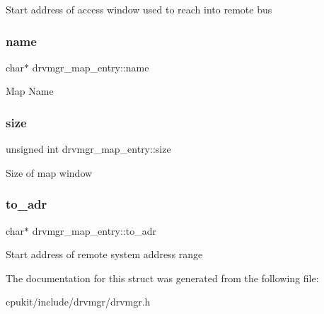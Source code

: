 Start address of access window used to reach into remote bus \mbox{\label{structdrvmgr__map__entry_ab2f1dd43f429f44321b1671b23138f14}} 
\subsubsection{\texorpdfstring{name}{name}}
{\footnotesize\ttfamily char$\ast$ drvmgr\+\_\+map\+\_\+entry\+::name}

Map Name \mbox{\label{structdrvmgr__map__entry_a6e86bd0c574cd6f7ef1046a4864caccd}} 
\subsubsection{\texorpdfstring{size}{size}}
{\footnotesize\ttfamily unsigned int drvmgr\+\_\+map\+\_\+entry\+::size}

Size of map window \mbox{\label{structdrvmgr__map__entry_acd883f6a4d144d58dee3264da6fa9d38}} 
\subsubsection{\texorpdfstring{to\_adr}{to\_adr}}
{\footnotesize\ttfamily char$\ast$ drvmgr\+\_\+map\+\_\+entry\+::to\+\_\+adr}

Start address of remote system address range 

The documentation for this struct was generated from the following file\+:\begin{DoxyCompactItemize}
\item 
cpukit/include/drvmgr/drvmgr.\+h\end{DoxyCompactItemize}
